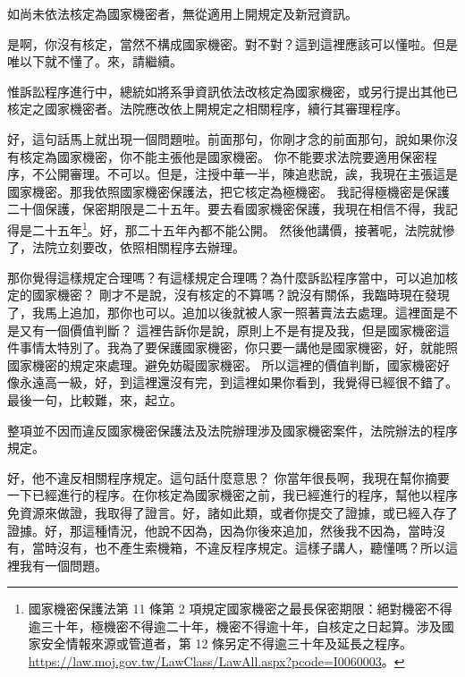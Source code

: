 \hypertarget{c11:cue:242}{}如尚未依法核定為國家機密者，無從適用上開規定及新冠資訊。\par{}是啊，你沒有核定，當然不構成國家機密。對不對？這到這裡應該可以懂啦。但是唯以下就不懂了。來，請繼續。

\hypertarget{c11:cue:243}{}惟訴訟程序進行中，總統如將系爭資訊依法改核定為國家機密，或另行提出其他已核定之國家機密者。法院應改依上開規定之相關程序，續行其審理程序。

\hypertarget{c11:cue:244}{}好，這句話馬上就出現一個問題啦。前面那句，你剛才念的前面那句，說如果你沒有核定為國家機密，你不能主張他是國家機密。
\hypertarget{c11:cue:245}{}你不能要求法院要適用保密程序，不公開審理。不可以。但是，注授中華一半，陳追悲說，誒，我現在主張這是國家機密。那我依照國家機密保護法，把它核定為極機密。
\hypertarget{c11:cue:246}{}我記得極機密是保護二十個保護，保密期限是二十五年。要去看國家機密保護，我現在相信不得，我記得是二十五年\footnote{國家機密保護法第 11 條第 2 項規定國家機密之最長保密期限：絕對機密不得逾三十年，極機密不得逾二十年，機密不得逾十年，自核定之日起算。涉及國家安全情報來源或管道者，第 12 條另定不得逾三十年及延長之程序。\url{https://law.moj.gov.tw/LawClass/LawAll.aspx?pcode=I0060003}。}。好，那二十五年內都不能公開。
\hypertarget{c11:cue:247}{}然後他講價，接著呢，法院就慘了，法院立刻要改，依照相關程序去辦理。

\hypertarget{c11:cue:248}{}那你覺得這樣規定合理嗎？有這樣規定合理嗎？為什麼訴訟程序當中，可以追加核定的國家機密？
\hypertarget{c11:cue:249}{}剛才不是說，沒有核定的不算嗎？說沒有關係，我臨時現在發現了，我馬上追加，那你也可以。追加以後就被人家一照著賣法去處理。這裡面是不是又有一個價值判斷？
\hypertarget{c11:cue:250}{}這裡告訴你是說，原則上不是有提及我，但是國家機密這件事情太特別了。我為了要保護國家機密，你只要一講他是國家機密，好，就能照國家機密的規定來處理。避免妨礙國家機密。
\hypertarget{c11:cue:251}{}所以這裡的價值判斷，國家機密好像永遠高一級，好，到這裡還沒有完，到這裡如果你看到，我覺得已經很不錯了。最後一句，比較難，來，起立。

\hypertarget{c11:cue:252}{}整項並不因而違反國家機密保護法及法院辦理涉及國家機密案件，法院辦法的程序規定。\par{}好，他不違反相關程序規定。這句話什麼意思？
\hypertarget{c11:cue:253}{}你當年很長啊，我現在幫你摘要一下已經進行的程序。在你核定為國家機密之前，我已經進行的程序，幫他以程序免資源來做證，我取得了證言。好，諸如此類，或者你提交了證據，或已經入存了證據。好，那這種情況，他說不因為，因為你後來追加，然後我不因為，當時沒有，當時沒有，也不產生索機箱，不違反程序規定。這樣子講人，聽懂嗎？所以這裡我有一個問題。

